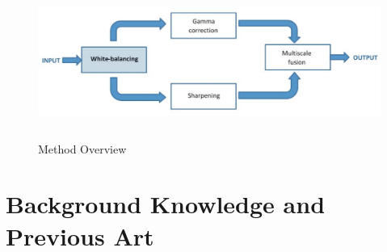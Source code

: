 \documentclass[hidelinks, 12pt]{report}
\begin{document}
\begin{figure}[H]
\centering
\includegraphics[width=15cm,height=5cm]{Block.png}
\caption[Method Overview]{Method Overview}
\label{Overview}
\end{figure}
\chapter{Background Knowledge and Previous Art}
\fancyhf{}
\fancyhead[r]{%
   \itshape
   \footnotesize{\chaptermark}
   \leftmark}

\fancyfoot[RE,RO]{\footnotesize\thepage}
 
\end{document}
